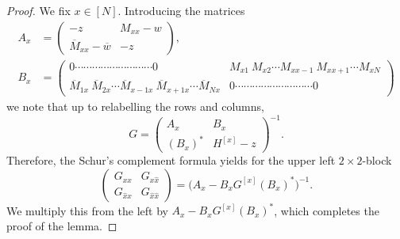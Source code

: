 \documentclass[10pt,a4paper]{amsart}
\numberwithin{equation}{section}
\newcommand*\barr[1]{\overline{#1}}
\newcommand*\ubarr[1]{{\widehat{#1}}}
\begin{document}
	\begin{proof}
		We fix $x \in [N]$. Introducing the matrices 
		\begin{align*}
			A_{x} &= \left( \begin{array}{cc}-z                            & M_{xx} -w          \\
				\overline{M}_{xx}-\overline{w}& -z  \end{array}\right),  \\
			B_{ x} & = \left(\begin{array}{cc}0\cdots\cdots\cdots\cdots\cdots\cdots \cdots \cdots \cdots 0 & M_{x1}~ M_{x2}\cdots M_{x x-1}~ M_{x x+1} \cdots M_{x N} \\ \overline{M}_{1x} ~ \overline{M}_{2x} \cdots \barr{M}_{x-1 x} ~ \barr{M}_{x+1 x} \cdots \barr{M}_{Nx} & 0 \cdots\cdots\cdots\cdots\cdots\cdots \cdots \cdots \cdots 0  \end{array}\right)
		\end{align*}
		we note that  up to relabelling the rows and columns,  
		\begin{equation*} 
			G = \begin{pmatrix} A_{ x} & B_{ x}  \\ (B_{x})^* &  H^{[x]} -z  \end{pmatrix}^{-1}. 
		\end{equation*} 
		Therefore, the Schur's complement formula  
		yields for the upper left $2\times 2$-block 
		\[ \begin{pmatrix} G_{xx} & G_{x\ubarr{x}} \\ G_{\ubarr{x}x} & G_{\ubarr{x}\ubarr{x}} 
		\end{pmatrix} = \big(A_x - B_x G^{[x]} (B_x)^*\big)^{-1}. \] 
		We multiply this from the left by $A_x - B_x G^{[x]} (B_x)^*$, which completes the proof of the lemma.
	\end{proof}
	
\end{document}
